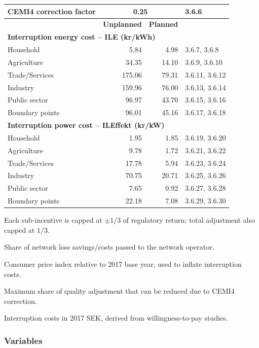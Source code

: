 \begin{table}[H]
\begin{threeparttable}
\begin{tabular}{@{}lrrl@{}}
CEMI4 correction factor\tnote{d} & \multicolumn{2}{c}{0.25} & 3.6.6 \\
\midrule
& \textbf{Unplanned} & \textbf{Planned} & \\
\multicolumn{4}{l}{\textbf{Interruption energy cost -- ILE (kr/kWh)}\tnote{e}} \\
Household & 5.84 & 4.98 & 3.6.7, 3.6.8 \\
Agriculture & 34.35 & 14.10 & 3.6.9, 3.6.10 \\
Trade/Services & 175.06 & 79.31 & 3.6.11, 3.6.12 \\
Industry & 159.96 & 76.00 & 3.6.13, 3.6.14 \\
Public sector & 96.97 & 43.70 & 3.6.15, 3.6.16 \\
Boundary points & 96.01 & 45.16 & 3.6.17, 3.6.18 \\
\midrule
\multicolumn{4}{l}{\textbf{Interruption power cost -- ILEffekt (kr/kW)}\tnote{e}} \\
Household & 1.95 & 1.85 & 3.6.19, 3.6.20 \\
Agriculture & 9.78 & 1.72 & 3.6.21, 3.6.22 \\
Trade/Services & 17.78 & 5.94 & 3.6.23, 3.6.24 \\
Industry & 70.75 & 20.71 & 3.6.25, 3.6.26 \\
Public sector & 7.65 & 0.92 & 3.6.27, 3.6.28 \\
Boundary points & 22.18 & 7.08 & 3.6.29, 3.6.30 \\
\bottomrule
\end{tabular}
\begin{tablenotes}
\item[a] Each sub-incentive is capped at $\pm 1/3$ of regulatory return; total adjustment also capped at $1/3$.
\item[b] Share of network loss savings/costs passed to the network operator.
\item[c] Consumer price index relative to 2017 base year, used to inflate interruption costs.
\item[d] Maximum share of quality adjustment that can be reduced due to CEMI4 correction.
\item[e] Interruption costs in 2017 SEK, derived from willingness-to-pay studies.
\end{tablenotes}
\end{threeparttable}
\end{table}

\subsubsection{Variables}

